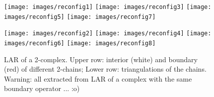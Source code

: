 \documentclass[11pt,oneside]{article}	%
\begin{document}
\begin{figure}[htbp] %
   \centering
   \texttt{[image: images/reconfig1]} 
   \texttt{[image: images/reconfig3]} 
   \texttt{[image: images/reconfig5]} 
   \texttt{[image: images/reconfig7]}
   
   \texttt{[image: images/reconfig2]} 
   \texttt{[image: images/reconfig4]} 
   \texttt{[image: images/reconfig6]} 
   \texttt{[image: images/reconfig8]}
    
   \caption{LAR of a 2-complex. Upper row: interior (white) and boundary (red) of different 2-chains; Lower row: triangulations of the chains. Warning: all extracted from LAR of a complex with the same boundary operator ... :o)}
   \label{fig:squareholes}
\end{figure}
\end{document}
